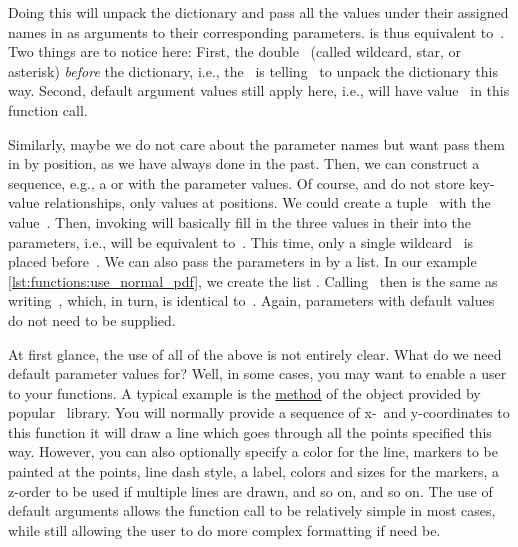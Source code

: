 Doing this will unpack the dictionary  and pass all the values under their assigned names in as arguments to their corresponding parameters.
 is thus equivalent to~.
Two things are to notice here:
First, the double~\pythonil{*} (called %
wildcard, %
star, or %
asterisk) %
\emph{before} the dictionary, i.e., the~\pythonil{**} is telling \python\ to unpack the dictionary this way.
Second, default argument values still apply here, i.e.,  will have value~ in this function call.

Similarly, maybe we do not care about the parameter names but want pass them in by position, as we have always done in the past.
Then, we can construct a sequence, e.g., a  or  with the parameter values.
Of course,  and  do not store key-value relationships, only values at positions.
We could create a tuple~ with the value~.
Then, invoking  will basically fill in the three values in their into the parameters, i.e., will be equivalent to~.
This time, only a single wildcard~\pythonil{*} is placed before~.
We can also pass the parameters in by  a list.
In our example \cref{lst:functions:use_normal_pdf}, we create the list .
Calling~ then is the same as writing~, which, in turn, is identical to~.
Again, parameters with default values do not need to be supplied.

At first glance, the use of all of the above is not entirely clear.
What do we need default parameter values for?
Well, in some cases, you may want to enable a user to  your functions.
A typical example is the \href{https://matplotlib.org/stable/api/_as_gen/matplotlib.axes.Axes.plot.html}{ method} of the  object provided by popular \matplotlib\ library.
You will normally provide a sequence of x-\ and y\nobreakdashes-coordinates to this function it will draw a line which goes through all the points specified this way.
However, you can also optionally specify a color for the line, markers to be painted at the points, line dash style, a label, colors and sizes for the markers, a z\nobreakdashes-order to be used if multiple lines are drawn, and so on, and so on.
The use of default arguments allows the function call to be relatively simple in most cases, while still allowing the user to do more complex formatting if need be.

